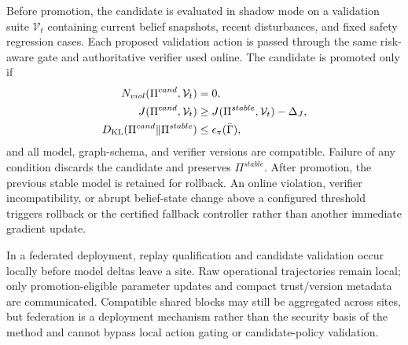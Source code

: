 Before promotion, the candidate is evaluated in shadow mode on a validation suite $\mathcal{V}_t$ containing current belief snapshots, recent disturbances, and fixed safety regression cases. Each proposed validation action is passed through the same risk-aware gate and authoritative verifier used online. The candidate is promoted only if
\begin{align}
\label{eq-policy-promotion}
N_{viol}(\Pi^{cand},\mathcal{V}_t)&=0,\\
J(\Pi^{cand},\mathcal{V}_t)&\ge J(\Pi^{stable},\mathcal{V}_t)-\Delta_J,\\
D_{\rm KL}(\Pi^{cand}\|\Pi^{stable})&\le\epsilon_\pi(\bar\Gamma),
\end{align}
and all model, graph-schema, and verifier versions are compatible. Failure of any condition discards the candidate and preserves $\Pi^{stable}$. After promotion, the previous stable model is retained for rollback. An online violation, verifier incompatibility, or abrupt belief-state change above a configured threshold triggers rollback or the certified fallback controller rather than another immediate gradient update.

In a federated deployment, replay qualification and candidate validation occur locally before model deltas leave a site. Raw operational trajectories remain local; only promotion-eligible parameter updates and compact trust/version metadata are communicated. Compatible shared blocks may still be aggregated across sites, but federation is a deployment mechanism rather than the security basis of the method and cannot bypass local action gating or candidate-policy validation.

